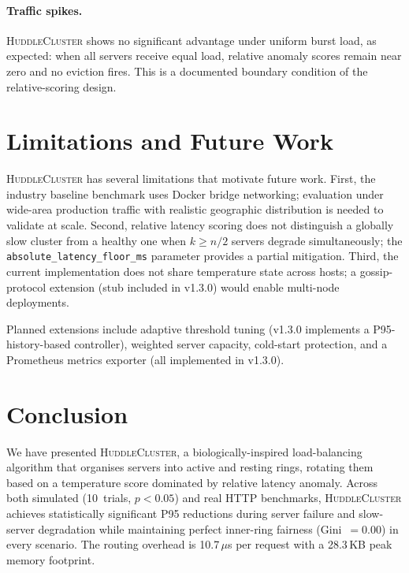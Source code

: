 \documentclass[10pt,twocolumn]{article}
\begin{document}
\paragraph{Traffic spikes.}
\textsc{HuddleCluster} shows no significant advantage under uniform burst
load, as expected: when all servers receive equal load, relative anomaly
scores remain near zero and no eviction fires.
This is a documented boundary condition of the relative-scoring design.

\section{Limitations and Future Work}
\label{sec:limits}

\textsc{HuddleCluster} has several limitations that motivate future work.
First, the industry baseline benchmark uses Docker bridge networking;
evaluation under wide-area production traffic with realistic
geographic distribution is needed to validate at scale.
Second, relative latency scoring does not distinguish a globally slow
cluster from a healthy one when $k \geq n/2$ servers degrade
simultaneously; the \texttt{absolute\_latency\_floor\_ms} parameter
provides a partial mitigation.
Third, the current implementation does not share temperature state
across hosts; a gossip-protocol extension (stub included in v1.3.0)
would enable multi-node deployments.

Planned extensions include adaptive threshold tuning
(v1.3.0 implements a P95-history-based controller),
weighted server capacity, cold-start protection, and a Prometheus
metrics exporter (all implemented in v1.3.0).

\section{Conclusion}
\label{sec:conclusion}

We have presented \textsc{HuddleCluster}, a biologically-inspired
load-balancing algorithm that organises servers into active and resting
rings, rotating them based on a temperature score dominated by relative
latency anomaly.
Across both simulated (10~trials, $p{<}0.05$) and real HTTP benchmarks,
\textsc{HuddleCluster} achieves statistically significant P95 reductions
during server failure and slow-server degradation while maintaining
perfect inner-ring fairness (Gini~$= 0.00$) in every scenario.
The routing overhead is 10.7\,$\mu$s per request with a 28.3\,KB peak
memory footprint.
\end{document}
